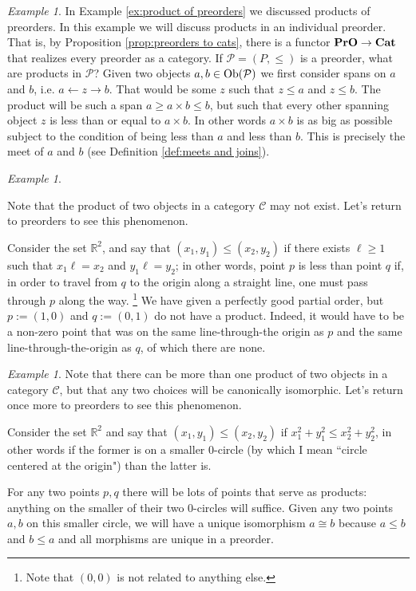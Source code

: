 \documentclass{book}
\def\tn{\textnormal}
\def\mc{\mathcal}
\def\RR{{\mathbb R}}
\def\Ob{\tn{Ob}}
\def\to{\rightarrow}
\def\from{\leftarrow}
\def\iso{\cong}
\def\Cat{{\bf Cat}}
\def\PrO{{\bf PrO}}
\def\mcC{\mc{C}}
\def\mcP{\mc{P}}
\theoremstyle{remark}
\newtheorem{example}[subsubsection]{Example}
\theoremstyle{definition}
\begin{document}
\begin{example}

In Example \ref{ex:product of preorders} we discussed products of preorders. In this example we will discuss products in an individual preorder. That is, by Proposition \ref{prop:preorders to cats}, there is a functor $\PrO\to\Cat$\index{a functor!$\PrO\to\Cat$} that realizes every preorder as a category. If $\mcP=(P,\leq)$ is a preorder, what are products in $\mcP$? Given two objects $a,b\in\Ob(\mcP)$ we first consider spans on $a$ and $b$, i.e. $a\from z\to b$. That would be some $z$ such that $z\leq a$ and $z\leq b$. The product will be such a span $a\geq a\times b\leq b$, but such that every other spanning object $z$ is less than or equal to $a\times b$. In other words $a\times b$ is as big as possible subject to the condition of being less than $a$ and less than $b$. This is precisely the meet of $a$ and $b$ (see Definition \ref{def:meets and joins}). 

\end{example}

\begin{example}\label{ex:products dont exist}

Note that the product of two objects in a category $\mcC$ may not exist. Let's return to preorders to see this phenomenon.

Consider the set $\RR^2$, and say that $(x_1,y_1)\leq (x_2,y_2)$ if there exists $\ell\geq 1$ such that $x_1\ell=x_2$ and $y_1\ell=y_2$; in other words, point $p$ is less than point $q$ if, in order to travel from $q$ to the origin along a straight line, one must pass through $p$ along the way. 
\footnote{Note that $(0,0)$ is not related to anything else.} 
We have given a perfectly good partial order, but $p:=(1,0)$ and $q:=(0,1)$ do not have a product. Indeed, it would have to be a non-zero point that was on the same line-through-the origin as $p$ and the same line-through-the-origin as $q$, of which there are none.

\end{example}

\begin{example}

Note that there can be more than one product of two objects in a category $\mcC$, but that any two choices will be canonically isomorphic. Let's return once more to preorders to see this phenomenon.

Consider the set $\RR^2$ and say that $(x_1,y_1)\leq (x_2,y_2)$ if $x_1^2+y_1^2\leq x_2^2+y_2^2$, in other words if the former is on a smaller 0-circle (by which I mean ``circle centered at the origin") than the latter is. 

For any two points $p,q$ there will be lots of points that serve as products: anything on the smaller of their two 0-circles will suffice. Given any two points $a,b$ on this smaller circle, we will have a unique isomorphism $a\iso b$ because $a\leq b$ and $b\leq a$ and all morphisms are unique in a preorder.

\end{example}
\end{document}
